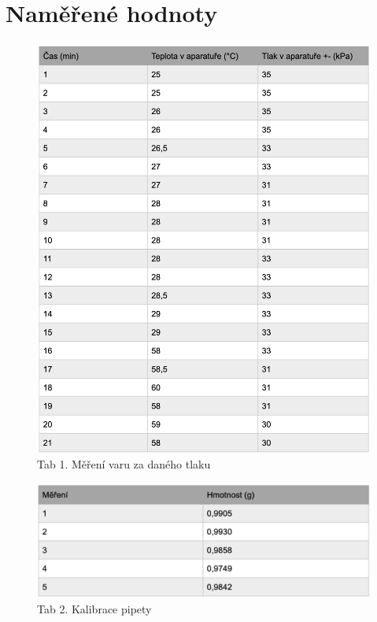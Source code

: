 \documentclass[13pt, a4paper, twoside]{article}
\begin{document}
\section*{Naměřené hodnoty}

\begin{figure}[H]
    \centering
    \includegraphics[width=6in]{uloha_9_tab_1.png}
    \caption*{Tab 1. Měření varu za daného tlaku}
\end{figure}




\begin{figure}[H]
    \centering
    \includegraphics[width=6in]{uloha_9_tab_2.png}
    \caption*{Tab 2. Kalibrace pipety}
\end{figure}
\end{document}

